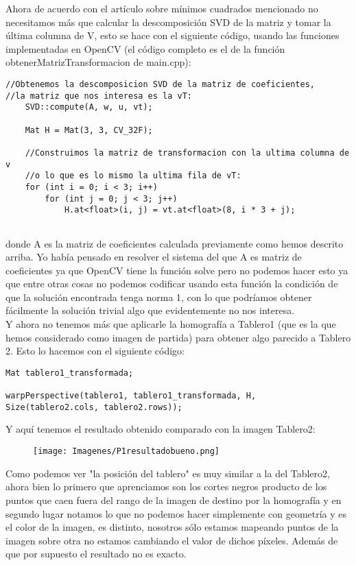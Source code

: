 \documentclass[10pt,a4paper]{article}
\begin{document}
Ahora de acuerdo con el artículo sobre mínimos cuadrados mencionado no necesitamos más que calcular la descomposición SVD de la matriz y tomar la última columna de V, esto se hace con el siguiente código, usando las funciones implementadas en OpenCV (el código completo es el de la función obtenerMatrizTransformacion de main.cpp):\\

\begin{lstlisting}
//Obtenemos la descomposicion SVD de la matriz de coeficientes, 
//la matriz que nos interesa es la vT:
	SVD::compute(A, w, u, vt);

	Mat H = Mat(3, 3, CV_32F);

	//Construimos la matriz de transformacion con la ultima columna de v 
	//o lo que es lo mismo la ultima fila de vT:
	for (int i = 0; i < 3; i++)
		for (int j = 0; j < 3; j++)
			H.at<float>(i, j) = vt.at<float>(8, i * 3 + j);
	
\end{lstlisting}

donde A es la matriz de coeficientes calculada previamente como hemos descrito arriba. Yo había pensado en resolver el sistema del que A es matriz de coeficientes ya que OpenCV tiene la función solve pero no podemos hacer esto ya que entre otras cosas no podemos codificar usando esta función la condición de que la solución encontrada tenga norma 1, con lo que podríamos obtener fácilmente la solución trivial algo que evidentemente no nos interesa.\\

Y ahora no tenemos más que aplicarle la homografía a Tablero1 (que es la que hemos considerado como imagen de partida) para obtener algo parecido a Tablero 2. Esto lo hacemos con el siguiente código:\\

\begin{lstlisting}
Mat tablero1_transformada;

warpPerspective(tablero1, tablero1_transformada, H, Size(tablero2.cols, tablero2.rows));
\end{lstlisting}

Y aquí tenemos el resultado obtenido comparado con la imagen Tablero2:\\

\begin{figure}[H]
\centering
\texttt{[image: Imagenes/P1resultadobueno.png]}
\end{figure}

Como podemos ver "la posición del tablero" es muy similar a la del Tablero2, ahora bien lo primero que aprenciamos son los cortes negros producto de los puntos que caen fuera del rango de la imagen de destino por la homografía y en segundo lugar notamos lo que no podemos hacer simplemente con geometría y es el color de la imagen, es distinto, nosotros sólo estamos mapeando puntos de la imagen sobre otra no estamos cambiando el valor de dichos píxeles. Además de que por supuesto el resultado no es exacto.\\
\end{document}
